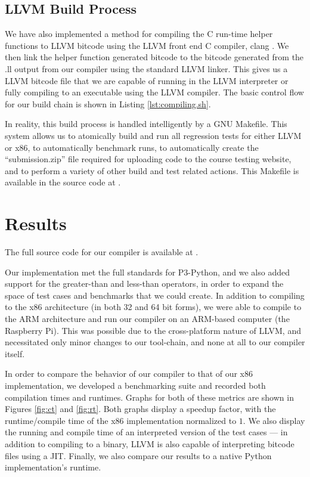 \documentclass[11pt,twocolumn]{article}
\begin{document}
\subsection{LLVM Build Process}

We have also implemented a method for compiling the C run-time helper
functions to LLVM bitcode using the LLVM front end C compiler, clang
\cite{clang.llvm.org}. We then link the helper function generated
bitcode to the bitcode generated from the .ll output from our compiler
using the standard LLVM linker. This gives us a LLVM bitcode file that
we are capable of running in the LLVM interpreter or fully compiling
to an executable using the LLVM compiler. The basic control flow for
our build chain is shown in Listing \ref{lst:compiling.sh}.



In reality, this build process is handled intelligently by a GNU
Makefile. This system allows us to atomically build and run all
regression tests for either LLVM or x86, to automatically benchmark
runs, to automatically create the ``submission.zip'' file required for
uploading code to the course testing website, and to perform a variety
of other build and test related actions. This Makefile is available in
the source code at \cite{github-repo}.

\section{Results}

The full source code for our compiler is available at \cite{github-repo}.

Our implementation met the full standards for P3-Python, and we also
added support for the greater-than and less-than operators, in order
to expand the space of test cases and benchmarks that we could
create. In addition to compiling to the x86 architecture (in both 32
and 64 bit forms), we were able to compile to the ARM architecture and
run our compiler on an ARM-based computer (the Raspberry
Pi\cite{raspberrypi.org}). This was possible due to the cross-platform
nature of LLVM, and necessitated only minor changes to our tool-chain,
and none at all to our compiler itself.

In order to compare the behavior of our compiler to that of our x86
implementation, we developed a benchmarking suite and recorded both
compilation times and runtimes. Graphs for both of these metrics are
shown in Figures \ref{fig:ct} and \ref{fig:rt}. Both graphs display a
speedup factor, with the runtime/compile time of the x86
implementation normalized to $1$. We also display the running and
compile time of an interpreted version of the test cases --- in
addition to compiling to a binary, LLVM is also capable of
interpreting bitcode files using a JIT. Finally, we also compare our
results to a native Python implementation's runtime.
\end{document}
